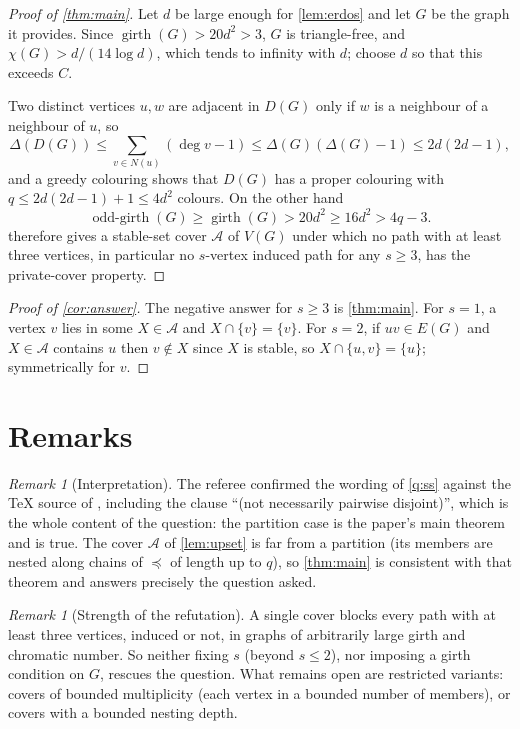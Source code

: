 \documentclass[11pt,a4paper]{article}
\theoremstyle{plain}
\theoremstyle{definition}
\theoremstyle{remark}
\newtheorem{remark}[theorem]{Remark}
\newcommand{\cA}{\mathcal A}
\DeclareMathOperator{\girth}{girth}
\DeclareMathOperator{\oddgirth}{odd\text{-}girth}
\begin{document}
\begin{proof}[Proof of \cref{thm:main}]\label{pf:main}
Let $d$ be large enough for \cref{lem:erdos} and let $G$ be the graph it provides. Since $\girth(G)>20d^2>3$, $G$ is triangle-free, and $\chi(G)>d/(14\log d)$, which tends to infinity with $d$; choose $d$ so that this exceeds $C$.

Two distinct vertices $u,w$ are adjacent in $D(G)$ only if $w$ is a neighbour of a neighbour of $u$, so
\[
 \Delta(D(G))\le\sum_{v\in N(u)}(\deg v-1)\le\Delta(G)(\Delta(G)-1)\le2d(2d-1),
\]
and a greedy colouring shows that $D(G)$ has a proper colouring with $q\le2d(2d-1)+1\le4d^2$ colours. On the other hand
\[
 \oddgirth(G)\ge\girth(G)>20d^2\ge16d^2>4q-3.
\]
 therefore gives a stable-set cover $\cA$ of $V(G)$ under which no path with at least three vertices, in particular no $s$-vertex induced path for any $s\ge3$, has the private-cover property.
\end{proof}

\begin{proof}[Proof of \cref{cor:answer}]
The negative answer for $s\ge3$ is \cref{thm:main}. For $s=1$, a vertex $v$ lies in some $X\in\cA$ and $X\cap\{v\}=\{v\}$. For $s=2$, if $uv\in E(G)$ and $X\in\cA$ contains $u$ then $v\notin X$ since $X$ is stable, so $X\cap\{u,v\}=\{u\}$; symmetrically for $v$.
\end{proof}

\section{Remarks}\label{sec:remarks}

\begin{remark}[Interpretation]
The referee confirmed the wording of \cref{q:ss} against the TeX source of \cite{SS17}, including the clause ``(not necessarily pairwise disjoint)'', which is the whole content of the question: the partition case is the paper's main theorem and is true. The cover $\cA$ of \cref{lem:upset} is far from a partition (its members are nested along chains of $\preceq$ of length up to $q$), so \cref{thm:main} is consistent with that theorem and answers precisely the question asked.
\end{remark}

\begin{remark}[Strength of the refutation]
A single cover blocks every path with at least three vertices, induced or not, in graphs of arbitrarily large girth and chromatic number. So neither fixing $s$ (beyond $s\le2$), nor imposing a girth condition on $G$, rescues the question. What remains open are restricted variants: covers of bounded multiplicity (each vertex in a bounded number of members), or covers with a bounded nesting depth.
\end{remark}
\end{document}
